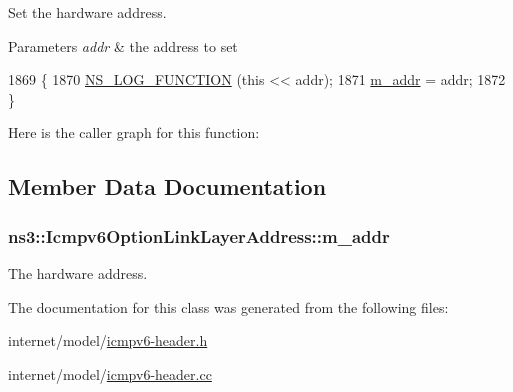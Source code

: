 Set the hardware address. 


\begin{DoxyParams}{Parameters}
{\em addr} & the address to set \\
\hline
\end{DoxyParams}

\begin{DoxyCode}
1869 \{
1870   \hyperlink{log-macros-disabled_8h_a90b90d5bad1f39cb1b64923ea94c0761}{NS\_LOG\_FUNCTION} (\textcolor{keyword}{this} << addr);
1871   \hyperlink{classns3_1_1Icmpv6OptionLinkLayerAddress_ac2258afbf60859f31e85104536c54350}{m\_addr} = addr;
1872 \}
\end{DoxyCode}


Here is the caller graph for this function\+:




\subsection{Member Data Documentation}
\subsubsection[{\texorpdfstring{m\+\_\+addr}{m_addr}}]{ ns3\+::\+Icmpv6\+Option\+Link\+Layer\+Address\+::m\+\_\+addr\hspace{0.3cm}{\ttfamily [private]}}\hypertarget{classns3_1_1Icmpv6OptionLinkLayerAddress_ac2258afbf60859f31e85104536c54350}{}\label{classns3_1_1Icmpv6OptionLinkLayerAddress_ac2258afbf60859f31e85104536c54350}


The hardware address. 



The documentation for this class was generated from the following files\+:\begin{DoxyCompactItemize}
\item 
internet/model/\hyperlink{icmpv6-header_8h}{icmpv6-\/header.\+h}\item 
internet/model/\hyperlink{icmpv6-header_8cc}{icmpv6-\/header.\+cc}\end{DoxyCompactItemize}
